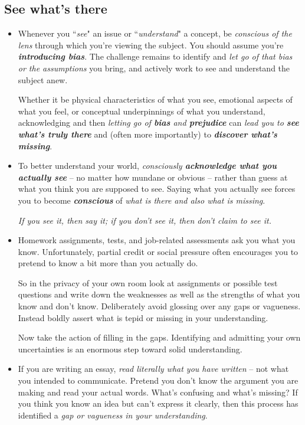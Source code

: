 \documentclass[11pt]{article}
\begin{document}
\subsection{See what's there}
\begin{itemize}
\item Whenever you ``\emph{see}" an issue or ``\emph{understand}" a concept, be \emph{conscious of the lens} through which you’re viewing the subject. You should assume you’re \emph{\textbf{introducing bias}}. The challenge remains to identify and \emph{let go of that bias or the assumptions} you bring, and actively work to see and understand the subject anew.

Whether it be physical characteristics of what you see, emotional aspects of what you feel, or conceptual underpinnings of what you understand, acknowledging and then \emph{letting go of \textbf{bias} and \textbf{prejudice}} can \emph{lead you to \textbf{see what’s truly there}} and (often more importantly) to \emph{\textbf{discover what’s missing}}.

\item To better understand your world, \emph{consciously \textbf{acknowledge what you actually see}} -- no matter how mundane or obvious -- rather than guess at what you think you are supposed to see. Saying what you actually see forces you to become \emph{\textbf{conscious}} of \emph{what is there and also what is missing}. 

\emph{If you see it, then say it; if you don’t see it, then don’t claim to see it.}

\item \begin{exercise}
Homework assignments, tests, and job-related assessments ask you what you know. Unfortunately, partial credit or social pressure often encourages you to pretend to know a bit more than you actually do. 

So in the privacy of your own room look at assignments or possible test questions and write down the weaknesses as well as the strengths of what you know and don’t know. Deliberately avoid glossing over any gaps or vagueness. Instead boldly assert what is tepid or missing in your understanding. 

Now take the action of filling in the gaps. Identifying and admitting your own uncertainties is an enormous step toward solid understanding.
\end{exercise}

\item If you are writing an essay, \emph{read literally what you have written} -- not what you intended to communicate.  Pretend you don’t know the argument you are making and read your actual words.  What’s confusing and what’s missing? If you think you know an idea but can’t express it clearly, then this process has identified a \emph{gap or vagueness in your understanding}. 


\end{itemize}
\end{document}
